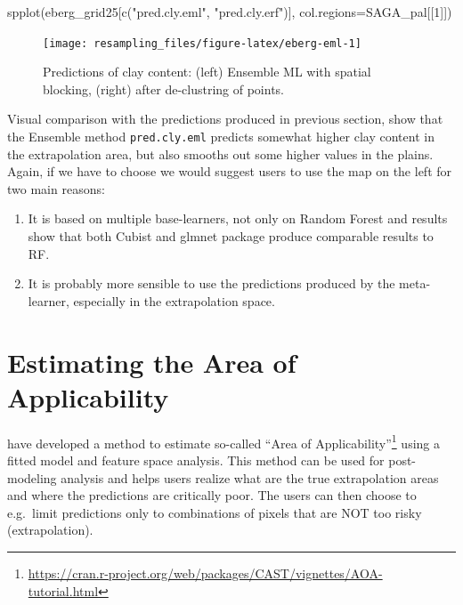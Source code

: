 \documentclass[
  graybox,natbib,nospthms]{svmono}
\newenvironment{Shaded}{\begin{snugshade}}{\end{snugshade}}
\newcommand{\AttributeTok}[1]{\textcolor[rgb]{0.61,0.61,0.61}{#1}}
\newcommand{\DecValTok}[1]{\textcolor[rgb]{0.06,0.06,0.06}{#1}}
\newcommand{\FunctionTok}[1]{\textcolor[rgb]{0,0,0}{#1}}
\newcommand{\NormalTok}[1]{#1}
\newcommand{\StringTok}[1]{\textcolor[rgb]{0.5,0.5,0.5}{#1}}
\providecommand{\tightlist}{%
  \setlength{\itemsep}{0pt}\setlength{\parskip}{0pt}}
\providecommand{\tightlist}{\setlength{\itemsep}{0pt}\setlength{\parskip}{0pt}}
\renewcommand{\href}[2]{#2 (\url{#1})}
\renewcommand{\href}[2]{#2\footnote{\url{#1}}}
\begin{document}
\begin{Shaded}
\begin{Highlighting}[]
\FunctionTok{spplot}\NormalTok{(eberg\_grid25[}\FunctionTok{c}\NormalTok{(}\StringTok{"pred.cly.eml"}\NormalTok{, }\StringTok{"pred.cly.erf"}\NormalTok{)], }\AttributeTok{col.regions=}\NormalTok{SAGA\_pal[[}\DecValTok{1}\NormalTok{]])}
\end{Highlighting}
\end{Shaded}

\begin{figure}

{\centering \texttt{[image: resampling\_files/figure-latex/eberg-eml-1]} 

}

\caption{Predictions of clay content: (left) Ensemble ML with spatial blocking, (right) after de-clustring of points.}\label{fig:eberg-eml}
\end{figure}

Visual comparison with the predictions produced in previous section, show that
the Ensemble method \texttt{pred.cly.eml} predicts somewhat higher clay content in the
extrapolation area, but also smooths out some higher values in the plains.
Again, if we have to choose we would suggest users to use the map on the left for
two main reasons:

\begin{enumerate}
\def\labelenumi{\arabic{enumi}.}
\tightlist
\item
  It is based on multiple base-learners, not only on Random Forest and results
  show that both Cubist and glmnet package produce comparable results to RF.\\
\item
  It is probably more sensible to use the predictions produced by the meta-learner,
  especially in the extrapolation space.
\end{enumerate}

\hypertarget{estimating-the-area-of-applicability}{%
\section{Estimating the Area of Applicability}\label{estimating-the-area-of-applicability}}

\citet{meyer2021predicting} have developed a method to estimate so-called \href{https://cran.r-project.org/web/packages/CAST/vignettes/AOA-tutorial.html}{``Area of Applicability''}
using a fitted model and feature space analysis. This method can be used for
post-modeling analysis and helps users realize what are the true extrapolation
areas and where the predictions are critically poor. The users can then choose to
e.g.~limit predictions only to combinations of pixels that are NOT too risky (extrapolation).
\end{document}
